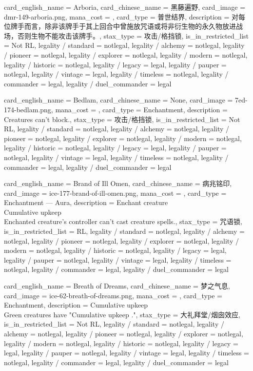 \documentclass[lang = cn, color = black, 10pt]{AllThatStax}
\begin{document}
\card
{
	card_english_name = {Arboria},
	card_chinese_name = {黑藤遍野},
	card_image = dmr-149-arboria.png,
	mana_cost = ,
	card_type = 普世结界,
	description = {对每位牌手而言，除非该牌手于其上回合中曾施放咒语或将非衍生物的永久物放进战场，否则生物不能攻击该牌手。},
	stax_type = 攻击/格挡锁,
	is_in_restricted_list = Not RL,
	legality / standard = notlegal,
	legality / alchemy = notlegal,
	legality / pioneer = notlegal,
	legality / explorer = notlegal,
	legality / modern = notlegal,
	legality / historic = notlegal,
	legality / legacy = legal,
	legality / pauper = notlegal,
	legality / vintage = legal,
	legality / timeless = notlegal,
	legality / commander = legal,
	legality / duel_commander = legal
}

\card
{
	card_english_name = {Bedlam},
	card_chinese_name = {None},
	card_image = 7ed-174-bedlam.png,
	mana_cost = ,
	card_type = Enchantment,
	description = {Creatures can't block.},
	stax_type = 攻击/格挡锁,
	is_in_restricted_list = Not RL,
	legality / standard = notlegal,
	legality / alchemy = notlegal,
	legality / pioneer = notlegal,
	legality / explorer = notlegal,
	legality / modern = notlegal,
	legality / historic = notlegal,
	legality / legacy = legal,
	legality / pauper = notlegal,
	legality / vintage = legal,
	legality / timeless = notlegal,
	legality / commander = legal,
	legality / duel_commander = legal
}

\card
{
	card_english_name = {Brand of Ill Omen},
	card_chinese_name = {病兆铭印},
	card_image = ice-177-brand-of-ill-omen.png,
	mana_cost = ,
	card_type = Enchantment — Aura,
	description = {Enchant creature\\
		Cumulative upkeep  \\
		Enchanted creature's controller can't cast creature spells.},
	stax_type = 咒语锁,
	is_in_restricted_list = RL,
	legality / standard = notlegal,
	legality / alchemy = notlegal,
	legality / pioneer = notlegal,
	legality / explorer = notlegal,
	legality / modern = notlegal,
	legality / historic = notlegal,
	legality / legacy = legal,
	legality / pauper = notlegal,
	legality / vintage = legal,
	legality / timeless = notlegal,
	legality / commander = legal,
	legality / duel_commander = legal
}

\card
{
	card_english_name = {Breath of Dreams},
	card_chinese_name = {梦之气息},
	card_image = ice-62-breath-of-dreams.png,
	mana_cost = ,
	card_type = Enchantment,
	description = {Cumulative upkeep  \\
		Green creatures have "Cumulative upkeep ."},
	stax_type = 大礼拜堂/烟囱效应,
	is_in_restricted_list = Not RL,
	legality / standard = notlegal,
	legality / alchemy = notlegal,
	legality / pioneer = notlegal,
	legality / explorer = notlegal,
	legality / modern = notlegal,
	legality / historic = notlegal,
	legality / legacy = legal,
	legality / pauper = notlegal,
	legality / vintage = legal,
	legality / timeless = notlegal,
	legality / commander = legal,
	legality / duel_commander = legal
}
\end{document}
